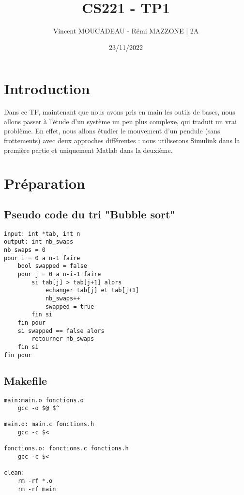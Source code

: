 \documentclass[12pt]{article}
\title{CS221 - TP1}
\author{Vincent MOUCADEAU - Rémi MAZZONE | 2A}
\date{23/11/2022}
\begin{document}
\maketitle

\tableofcontents
\newpage

\section{Introduction}
Dans ce TP, maintenant que nous avons pris en main les outils de bases, nous allons passer à l'étude d'un système un peu plus complexe, qui traduit un vrai problème. En effet, nous allons étudier le mouvement d'un pendule (sans frottements) avec deux approches différentes : nous utiliserons Simulink dans la première partie et uniquement Matlab dans la deuxième.

\section{Préparation} 
\subsection{Pseudo code du tri "Bubble sort"} 

\begin{lstlisting}[style=pseudoCode, caption=Pseudo code du tri "Bubble sort" optimisé]
input: int *tab, int n
output: int nb_swaps
nb_swaps = 0
pour i = 0 a n-1 faire
    bool swapped = false
    pour j = 0 a n-i-1 faire
        si tab[j] > tab[j+1] alors
            echanger tab[j] et tab[j+1]
            nb_swaps++
            swapped = true
        fin si
    fin pour
    si swapped == false alors
        retourner nb_swaps
    fin si
fin pour
\end{lstlisting} 

\subsection{Makefile} 
\begin{lstlisting}[style=Makefile, caption=Makefile du projet]
main:main.o fonctions.o 
	gcc -o $@ $^

main.o: main.c fonctions.h 
	gcc -c $<

fonctions.o: fonctions.c fonctions.h 
	gcc -c $<

clean: 
	rm -rf *.o 
	rm -rf main
\end{lstlisting} 
\end{document}
